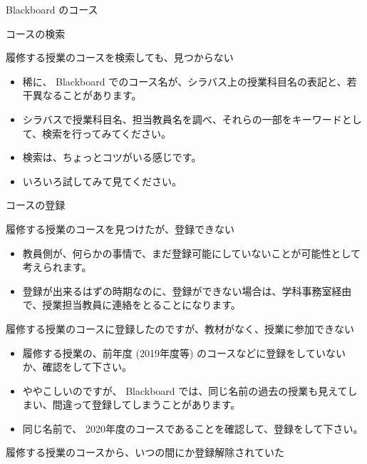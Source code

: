 \documentclass[a4j,10pt]{jsarticle}
\begin{document}
{\newpage\clearpage
{}%
\begin{frame}[label={sec:orgda0915a},fragile]{Blackboard のコース}
\begin{block}{コースの検索}
\begin{block}{履修する授業のコースを検索しても、見つからない}
\begin{itemize}
\item 稀に、 Blackboard でのコース名が、シラバス上の授業科目名の表記と、若干異なることがあります。
\item シラバスで授業科目名、担当教員名を調べ、それらの一部をキーワードとして、検索を行ってみてください。
\item 検索は、ちょっとコツがいる感じです。
\item いろいろ試してみて見てください。
\end{itemize}
\end{block}
\end{block}
\par
\begin{block}{コースの登録}
\begin{block}{履修する授業のコースを見つけたが、登録できない}
\begin{itemize}
\item 教員側が、何らかの事情で、まだ登録可能にしていないことが可能性として考えられます。
\item 登録が出来るはずの時期なのに、登録ができない場合は、学科事務室経由で、授業担当教員に連絡をとることになります。
\end{itemize}
\end{block}
\par
\begin{block}{履修する授業のコースに登録したのですが、教材がなく、授業に参加できない}
\begin{itemize}
\item 履修する授業の、前年度 (2019年度等) のコースなどに登録をしていないか、確認をして下さい。
\item ややこしいのですが、 Blackboard では、同じ名前の過去の授業も見えてしまい、間違って登録してしまうことがあります。
\item 同じ名前で、 2020年度のコースであることを確認して、登録をして下さい。
\end{itemize}
\end{block}
\par
\begin{block}{履修する授業のコースから、いつの間にか登録解除されていた}
\begin{itemize}

\end{itemize}
\end{block}
\end{block}
\end{frame}}
\end{document}
